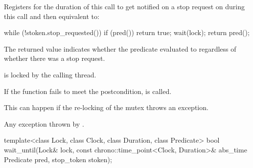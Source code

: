 \begin{itemdescr}
\pnum
\effects
Registers for the duration of this call 
to get notified on a stop request on 
during this call and then equivalent to:
\begin{codeblock}
while (!stoken.stop_requested()) {
  if (pred())
    return true;
  wait(lock);
}
return pred();
\end{codeblock}

\pnum
\begin{note}
The returned value indicates whether the predicate evaluated to
 regardless of whether there was a stop request.
\end{note}

\pnum
\ensures
{} is locked by the calling thread.

\pnum
\remarks
If the function fails to meet the postcondition,
 is called.
\begin{note}
This can happen if the re-locking of the mutex throws an exception.
\end{note}

\pnum
\throws
Any exception thrown by .
\end{itemdescr}

\begin{itemdecl}
template<class Lock, class Clock, class Duration, class Predicate>
  bool wait_until(Lock& lock, const chrono::time_point<Clock, Duration>& abs_time
                  Predicate pred, stop_token stoken);
\end{itemdecl}

